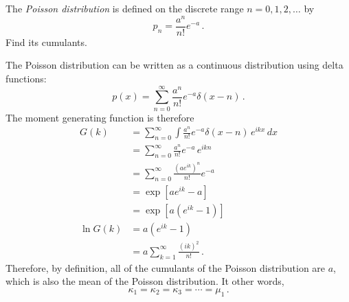 

The \emph{Poisson distribution} is defined on the discrete range $n=0, 1, 2,\ldots$ by
\begin{equation*}
p_n = \frac{a^n}{n!}e^{-a} \, .
\end{equation*}
Find its cumulants.


The Poisson distribution can be written as a continuous distribution using delta functions:
\begin{equation*}
p(x) = \sum_{n=0}^\infty \frac{a^n}{n!}e^{-a} \delta(x - n) \, .
\end{equation*}
The moment generating function is therefore
\begin{align*}
G(k)
&= \sum_{n=0}^\infty \int \frac{a^n}{n!}e^{-a} \delta(x - n) \, e^{i k x} \, dx \\
&= \sum_{n=0}^\infty \frac{a^n}{n!}e^{-a} \, e^{i k n} \\
&= \sum_{n=0}^\infty \frac{(ae^{ik})^n}{n!} e^{-a} \\
&= \exp \left[ a e^{ik} - a \right] \\
&= \exp \left[ a (e^{ik} - 1) \right] \\
\ln G(k)
&= a (e^{ik} - 1) \\
&= a \sum_{k=1}^\infty \frac{(ik)^2}{n!} \, .
\end{align*}
Therefore, by definition, all of the cumulants of the Poisson distribution are $a$, which is also the mean of the Poisson distribution. It other words,
\begin{equation*}
\kappa_1 = \kappa_2 = \kappa_3 = \cdots = \mu_1 \, .
\end{equation*}
